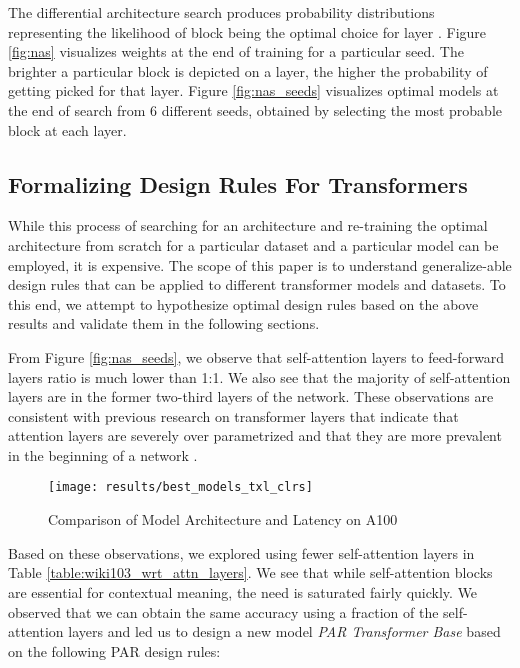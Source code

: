 \documentclass{article}
\begin{document}
The differential architecture search produces probability distributions  representing the likelihood of block  being the optimal choice for layer . Figure \ref{fig:nas} visualizes weights  at the end of training for a particular seed. The brighter a particular block is depicted on a layer, the higher the probability of getting picked for that layer. Figure \ref{fig:nas_seeds} visualizes optimal models at the end of search from 6 different seeds, obtained by selecting the most probable block at each layer.

\subsection{Formalizing Design Rules For Transformers} \label{design_rules}

While this process of searching for an architecture and re-training the optimal architecture from scratch for a particular dataset and a particular model can be employed, it is expensive. The scope of this paper is to understand generalize-able design rules that can be applied to different transformer models and datasets. To this end, we attempt to hypothesize optimal design rules based on the above results and validate them in the following sections. 

From Figure \ref{fig:nas_seeds}, we observe that self-attention layers to feed-forward layers ratio is much lower than 1:1. We also see that the majority of self-attention layers are in the former two-third layers of the network. These observations are consistent with previous research \cite{darksecretsofbert, collaborate} on transformer layers that indicate that attention layers are severely over parametrized and that they are more prevalent in the beginning of a network \cite{SandwichTransformer}. 

\begin{figure}[hbt!]
\centering
\texttt{[image: results/best\_models\_txl\_clrs]}
\caption{Comparison of Model Architecture and Latency on A100}
\label{fig:model_lat}
\end{figure}

Based on these observations, we explored using fewer self-attention layers in Table \ref{table:wiki103_wrt_attn_layers}. We see that while self-attention blocks are essential for contextual meaning, the need is saturated fairly quickly. We observed that we can obtain the same accuracy using a fraction of the self-attention layers and led us to design a new model \textit{PAR Transformer Base} based on the following PAR design rules:
\end{document}
